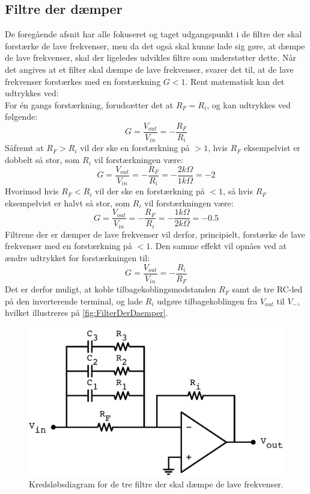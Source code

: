\subsection{Filtre der dæmper}
\label{FiltreDerDaemper}
%
De foregående afsnit har alle fokuseret og taget udgangspunkt i de filtre der skal forstærke de lave frekvenser, men da det også skal kunne lade sig gøre, at dæmpe de lave frekvenser, skal der ligeledes udvikles filtre som understøtter dette. Når det angives at et filter skal dæmpe de lave frekvenser, svarer det til, at de lave frekvenser forstærkes med en forstærkning $G<1$. Rent matematisk kan det udtrykkes ved:\\[5mm]   
%
For én gangs forstærkning, forudsætter det at $R_F = R_i$, og kan udtrykkes ved følgende:
%
\begin{equation}
	G = \frac{V_{out}}{V_{in}} = -\frac{R_F}{R_i}
\end{equation}
%
Såfremt at $R_F>R_i$ vil der ske en forstærkning på $>1$, hvis $R_F$ eksempelvist er dobbelt så stor, som $R_i$ vil forstærkningen være:
%
\begin{equation}
	G = \frac{V_{out}}{V_{in}} = -\frac{R_F}{R_i} = -\frac{2k\Omega}{1k\Omega} = -2
\end{equation}
%
Hvorimod hvis $R_F<R_i$ vil der ske en forstærkning på $<1$, så hvis $R_F$ eksempelvist er halvt så stor, som $R_i$ vil forstærkningen være:
%
\begin{equation}
	G = \frac{V_{out}}{V_{in}} = -\frac{R_F}{R_i} = -\frac{1k\Omega}{2k\Omega} = -0.5
\end{equation}
%
Filtrene der er dæmper de lave frekvenser vil derfor, principielt, forstærke de lave frekvenser med en forstærkning på $<1$. Den samme effekt vil opnåes ved at ændre udtrykket for forstærkningen til:
%
\begin{equation}
	G = \frac{V_{out}}{V_{in}} = -\frac{R_i}{R_F}
\end{equation}
%
Det er derfor muligt, at koble tilbagekoblingsmodstanden $R_F$ samt de tre RC-led på den inverterende terminal, og lade $R_i$ udgøre tilbagekoblingen fra $V_{out}$ til $V_-$, hvilket illustreres på \autoref{fig:FilterDerDaemper}. 
%
\begin{figure}[H]
	\centering
	\includegraphics[resolution=300,scale=\circuitSize]{Figure/DesignAfFilter/FilterWithLess3.pdf}
	\caption{Kredsløbsdiagram for de tre filtre der skal dæmpe de lave frekvenser.}
	\label{fig:FilterDerDaemper}
\end{figure}
